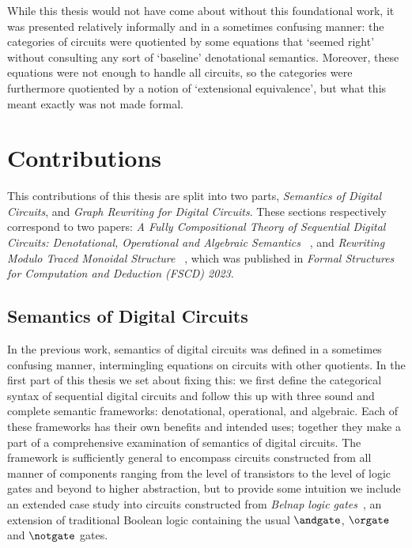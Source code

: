 While this thesis would not have come about without this foundational work, it
was presented relatively informally and in a sometimes confusing manner:
the categories of circuits were quotiented by some equations that `seemed right'
without consulting any sort of `baseline' denotational semantics.
Moreover, these equations were not enough to handle all circuits, so the
categories were furthermore quotiented by a notion of `extensional equivalence',
but what this meant exactly was not made formal.

\section{Contributions}

This contributions of this thesis are split into two parts,
\emph{Semantics of Digital Circuits}, and
\emph{Graph Rewriting for Digital Circuits}.
These sections respectively correspond to two papers:
\emph{%
    A Fully Compositional Theory of Sequential Digital Circuits:
    Denotational, Operational and Algebraic Semantics%
}~\cite{ghica2024fully}, and \emph{%
    Rewriting Modulo Traced Monoidal Structure%
}~\cite{ghica2023rewriting}, which was published in
\emph{Formal Structures for Computation and Deduction (FSCD) 2023}.

\subsection{Semantics of Digital Circuits}

In the previous work, semantics of digital circuits was defined in a sometimes
confusing manner, intermingling equations on circuits with other quotients.
In the first part of this thesis we set about fixing this: we first define the
categorical syntax of sequential digital circuits and follow this up with three
sound and complete semantic frameworks: denotational, operational, and
algebraic.
Each of these frameworks has their own benefits and intended uses; together they
make a part of a comprehensive examination of semantics of digital circuits.
The framework is sufficiently general to encompass circuits constructed from
all manner of components ranging from the level of transistors to the level of
logic gates and beyond to higher abstraction, but to provide some intuition we
include an extended case study into circuits constructed from
\emph{Belnap logic gates}~\cite{belnap1977useful}, an extension of traditional
Boolean logic containing the usual \(\andgate\), \(\orgate\) and \(\notgate\)
gates.

